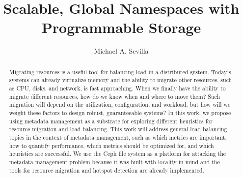 \title{Scalable, Global Namespaces with Programmable Storage}
\author{Michael A. Sevilla}
\deanlinethree{}

\begin{frontmatter}
	\maketitle\copyrightpage\tableofcontents\listoffigures\listoftables
	\begin{abstract}
		Migrating resources is a useful tool for balancing load in a
                distributed system. Today's systems can already virtualize memory and the
                ability to migrate other resources, such as CPU, disks, and network, is fast
                approaching. When we finally have the ability to migrate different resources,
                how do we know when and where to move them? Such migration will depend on the
                utilization, configuration, and workload, but how will we weight these factors
                to design robust, guaranteeable systems? In this work, we propose using
                metadata management as a substrate for exploring different heuristics for
                resource migration and load balancing. This work will address general load
                balancing topics in the context of metadata management, such as which metrics
                are important, how to quantify performance, which metrics should be optimized
                for, and which heuristics are successful. We use the Ceph file system as a
                platform for attacking the metadata management problem because it was built
                with locality in mind and the tools for resource migration and hotspot
                detection are already implemented.

	\end{abstract}
\end{frontmatter}


